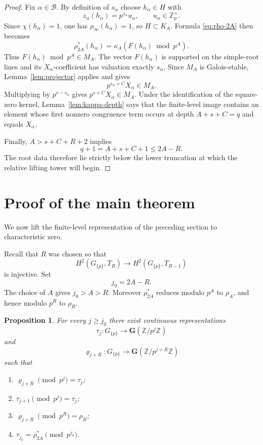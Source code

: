 \documentclass[11pt]{amsart}
\numberwithin{equation}{section}
\newcommand{\Z}{\mathbb Z}
\newcommand{\Zp}{\mathbb Z_p}
\newcommand{\GG}{\mathbf G}
\newtheorem{proposition}[theorem]{Proposition}
\theoremstyle{definition}
\begin{document}
\begin{proof}
Fix $\alpha\in\mathcal B$. By definition of $s_\alpha$ choose
$h_\alpha\in H$ with
\[
        z_\alpha(h_\alpha)=p^{s_\alpha}u_\alpha,
        \qquad u_\alpha\in\Zp^\times.
\]
Since $\chi(h_\alpha)=1$, one has
$\rho_\infty(h_\alpha)=1$, so $H\subset K_A$. Formula
\eqref{eq:rho-2A} then becomes
\[
        \rho_{2A}^*(h_\alpha)
        =\kappa_A(F(h_\alpha)\bmod p^A).
\]
Thus $F(h_\alpha)\bmod p^A\in M_A$.  The vector
$F(h_\alpha)$ is supported on the simple-root lines and its
$X_\alpha$-coefficient has valuation exactly $s_\alpha$.  Since $M_A$
is Galois-stable, Lemma~\ref{lem:projector} applies and gives
\[
        p^{s_\alpha+C}X_\alpha\in M_A.
\]
Multiplying by $p^{s-s_\alpha}$ gives
$p^{s+C}X_\alpha\in M_A$.  Under the identification of the
square-zero kernel, Lemma~\ref{lem:kappa-depth} says that the
finite-level image contains an element whose first nonzero congruence
term occurs at depth $A+s+C=q$ and equals $X_\alpha$.

Finally, $A>s+C+R+2$ implies
\[
 q+1=A+s+C+1\le2A-R.
\]
The root data therefore lie strictly below the lower truncation at
which the relative lifting tower will begin.
\end{proof}





\section{Proof of the main theorem}\label{sec:main-proof}

We now lift the finite-level representation of the preceding
section to characteristic zero.

Recall that $R$ was chosen so that
\[
 H^2(G_{\{p\}},T_R)\longrightarrow H^2(G_{\{p\}},T_{R-1})
\]
is injective. Set
\begin{equation}\label{eq:j0}
        j_0=2A-R.
\end{equation}
The choice of $A$ gives $j_0>A>R$.  Moreover
$\rho_{2A}^*$ reduces modulo $p^A$ to $\rho_A$, and hence modulo $p^R$
to $\rho_R$.

\begin{proposition}\label{prop:tower}
For every $j\ge j_0$ there exist continuous representations
\[
 \tau_j:G_{\{p\}}\longrightarrow\GG(\Z/p^j\Z)
\]
and
\[
 \varrho_{j+R}:G_{\{p\}}
 \longrightarrow\GG(\Z/p^{j+R}\Z)
\]
such that
\begin{enumerate}[label=\textup{(\arabic*)}]
\item $\varrho_{j+R}\pmod{p^j}=\tau_j$;
\item $\tau_{j+1}\pmod{p^j}=\tau_j$;
\item $\varrho_{j+R}\pmod{p^R}=\rho_R$;
\item $\tau_{j_0}=\rho_{2A}^*\pmod{p^{j_0}}$.
\end{enumerate}
\end{proposition}
\end{document}
